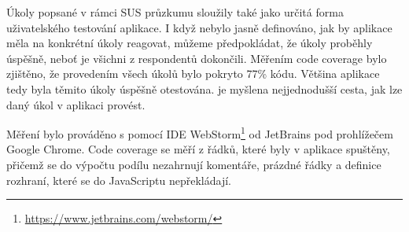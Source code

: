 \bigskip

Úkoly popsané v rámci SUS průzkumu sloužily také jako určitá forma uživatelského testování aplikace. I když nebylo jasně definováno, jak by aplikace měla na konkrétní úkoly reagovat, můžeme předpokládat, že úkoly proběhly úspěšně, neboť je všichni z respondentů dokončili. Měřením code coverage bylo zjištěno, že provedením všech úkolů bylo pokryto 77\% kódu. Většina aplikace tedy byla těmito úkoly úspěšně otestována.  je myšlena nejjednodušší cesta, jak lze daný úkol v aplikaci provést.

Měření bylo prováděno s pomocí IDE WebStorm\footnote{\url{https://www.jetbrains.com/webstorm/}} od JetBrains pod prohlížečem Google Chrome. Code coverage se měří z řádků, které byly v aplikace spuštěny, přičemž se do výpočtu podílu nezahrnují komentáře, prázdné řádky a definice rozhraní, které se do JavaScriptu nepřekládají.